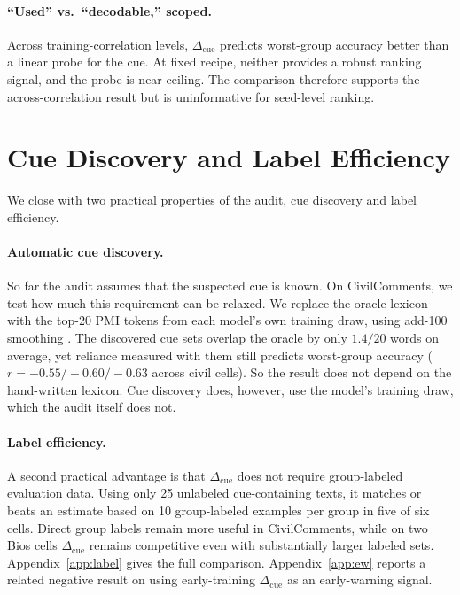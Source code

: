\documentclass[11pt]{article}
\newcommand{\cued}{\ensuremath{\Delta_{\mathrm{cue}}}}
\begin{document}
\paragraph{``Used'' vs.\ ``decodable,'' scoped.}
Across training-correlation levels, \cued{} predicts worst-group accuracy
better than a linear probe for the cue. At fixed recipe, neither provides a
robust ranking signal, and the probe is near ceiling. The comparison therefore
supports the across-correlation result but is uninformative for seed-level
ranking.

\section{Cue Discovery and Label Efficiency}
\label{sec:extras}

We close with two practical properties of the audit, cue discovery and label
efficiency.

\paragraph{Automatic cue discovery.}
So far the audit assumes that the suspected cue is known. On CivilComments, we
test how much this requirement can be relaxed. We replace the oracle lexicon with the top-20 PMI tokens from each model's own
training draw, using add-100 smoothing \citep{gururangan2018artifacts}. The
discovered cue sets overlap the oracle by only $1.4/20$ words on average, yet
reliance measured with them still predicts worst-group accuracy
($r=-0.55/-0.60/-0.63$ across civil cells). So the result does not depend on
the hand-written lexicon. Cue discovery does, however, use the model's training draw, which the audit itself does not.

\paragraph{Label efficiency.}
A second practical advantage is that \cued{} does not require group-labeled
evaluation data. Using only 25 unlabeled cue-containing texts, it matches or
beats an estimate based on 10 group-labeled examples per group in five of six
cells. Direct group labels remain more useful in CivilComments, while on two
Bios cells \cued{} remains competitive even with substantially larger labeled
sets. Appendix~\ref{app:label} gives the full comparison. Appendix~\ref{app:ew} reports a related negative result on using early-training
\cued{} as an early-warning signal.
\end{document}
